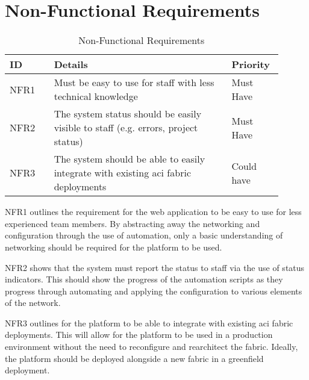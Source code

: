 \section{Non-Functional Requirements}
\label{requirements:non-functional}
\begin{center}
    \begin{table}[H]
        \begin{tabular}{p{0.15\linewidth} p{0.6\linewidth} p{0.15\linewidth}}
            \hline
            \textbf{ID}             & \textbf{Details}
                                    & \textbf{Priority}
            \\ \hline
            NFR1                    & Must be easy to use for staff with less technical
            knowledge
                                    & Must Have
            \\ \hline
            NFR2                    & The system status should be easily visible to staff (e.g.
            errors, project status) & Must Have                                                                                       \\ \hline
            NFR3                    & The system should be able to easily integrate with existing \gls{aci} fabric deployments & Could have
        \end{tabular}
        \caption{Non-Functional Requirements}
    \end{table}
\end{center}

NFR1 outlines the requirement for the web application to be easy to use for less experienced team members. By abstracting away the networking and configuration through the use of automation, only a basic understanding of networking should be required for the platform to be used.

NFR2 shows that the system must report the status to staff via the use of status indicators. This should show the progress of the automation scripts as they progress through automating and applying the configuration to various elements of the network.

NFR3 outlines for the platform to be able to integrate with existing \gls{aci} fabric deployments. This will allow for the platform to be used in a production environment without the need to reconfigure and rearchitect the fabric. Ideally, the platform should be deployed alongside a new fabric in a greenfield deployment.